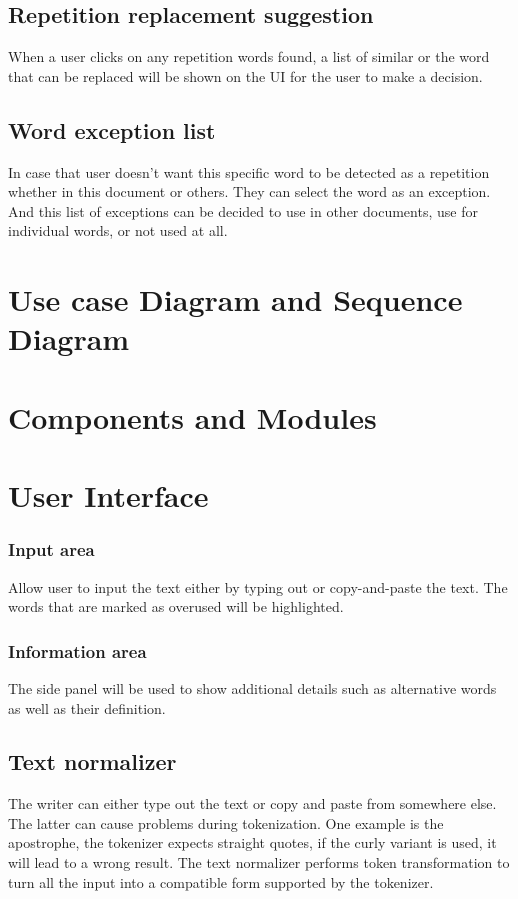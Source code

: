 \documentclass[12pt,oneside,openright,a4paper]{cpe-english-project}
\begin{document}
\subsection{Repetition replacement suggestion}

	When a user clicks on any repetition words found, a list of similar or the word that can be replaced will be shown on the UI for the user to make a decision.
\subsection{Word exception list}
	In case that user doesn’t want this specific word to be detected as a repetition whether in this document or others. They can select the word as an exception. And this list of exceptions can be decided to use in other documents, use for individual words, or not used at all.
\section{Use case Diagram and Sequence Diagram}

\section{Components and Modules}
\section{User Interface}
\subsubsection{Input area}
Allow user to input the text either by typing out or copy-and-paste the text.
The words that are marked as overused will be highlighted.
\subsubsection{Information area}
The side panel will be used to show additional details such as alternative words as well as their definition. 

\subsection{Text normalizer}
	The writer can either type out the text or copy and paste from somewhere else. The latter can cause problems during tokenization. One example is the apostrophe, the tokenizer expects straight quotes, if the curly variant is used, it will lead to a wrong result. The text normalizer performs token transformation to turn all the input into a compatible form supported by the tokenizer.
\end{document}
